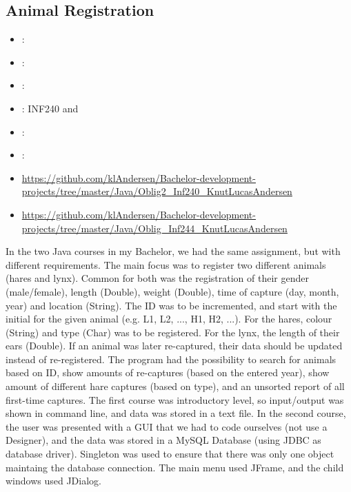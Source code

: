 \label{sec:section5}

\subsection{Animal Registration}
\label{sec:animal_registration}
\begin{itemize} 
	\item {}: 
	\item {}: 
	\item {}: 
	\item {}: INF240 and  
	\item {}: 
	\item {}: 
	\item {} \url{https://github.com/klAndersen/Bachelor-development-projects/tree/master/Java/Oblig2_Inf240_KnutLucasAndersen}
	\item {} \url{https://github.com/klAndersen/Bachelor-development-projects/tree/master/Java/Oblig_Inf244_KnutLucasAndersen}
\end{itemize} 
In the two Java courses in my Bachelor, we had the same assignment, but with different requirements. 
The main focus was to register two different animals (hares and lynx). 
Common for both was the registration of their gender (male/female), length (Double), weight (Double), time of capture (day, month, year) and location (String). 
The ID was to be incremented, and start with the initial for the given animal (e.g. L1, L2, ..., H1, H2, ...). 
For the hares, colour (String) and type (Char) was to be registered. 
For the lynx, the length of their ears (Double).
\vspace{0.5em}\newline
If an animal was later re-captured, their data should be updated instead of re-registered. 
The program had the possibility to search for animals based on ID, show amounts of re-captures (based on the entered year), 
show amount of different hare captures (based on type), and an unsorted report of all first-time captures.
\vspace{0.5em}\newline
The first course was introductory level, so input/output was shown in command line, and data was stored in a text file. 
In the second course, the user was presented with a GUI that we had to code ourselves (not use a Designer), and the data was stored in a MySQL Database 
(using JDBC as database driver). 
Singleton was used to ensure that there was only one object maintaing the database connection. 
The main menu used JFrame, and the child windows used JDialog.

